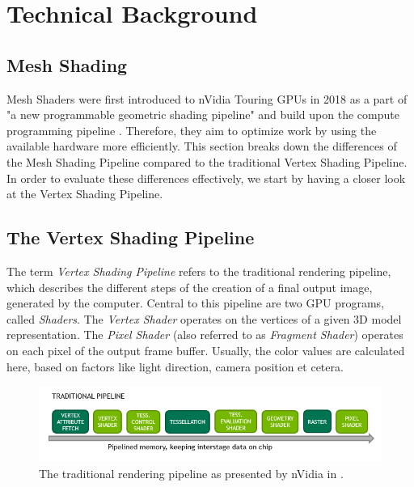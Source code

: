 \chapter{Technical Background} \label{cpt-technical-background}


    
\section{Mesh Shading} \label{sec-mesh-shading}


Mesh Shaders were first introduced to nVidia Touring \ac{GPU}s in 2018 as a part of
"a new programmable geometric shading pipeline" and build upon the compute programming 
pipeline \cite[Christoph Kubisch]{Kubisch2018}. Therefore, they aim to optimize work by 
using the available hardware more efficiently. This section breaks down the differences 
of the Mesh Shading Pipeline compared to the traditional Vertex Shading Pipeline. In order 
to evaluate these differences effectively, we start by having a closer look at the 
Vertex Shading Pipeline.

\section{The Vertex Shading Pipeline} \label{sec-vertex-shading-pipeline}

The term \emph{Vertex Shading Pipeline} refers to the traditional rendering pipeline, which 
describes the different steps of the creation of a final output image, generated by the 
computer. Central to this pipeline are two \ac{GPU} programs, called \emph{Shaders}. The 
\emph{Vertex Shader} operates on the vertices of a given 3D model representation. 
The \emph{Pixel Shader} (also referred to as \emph{Fragment Shader}) operates on each pixel 
of the output frame buffer. Usually, the color values are calculated here, based on factors 
like light direction, camera position et cetera. \\

\begin{figure}[h]
    \centering
    \includegraphics[width=\linewidth]{images/graphics/traditional-rendering-pipeline.png}
    \caption{The traditional rendering pipeline as presented by nVidia in \cite[Christoph Kubisch]{Kubisch2018}.}
    \label{fig:traditional-rendering-pipeline}
\end{figure}

